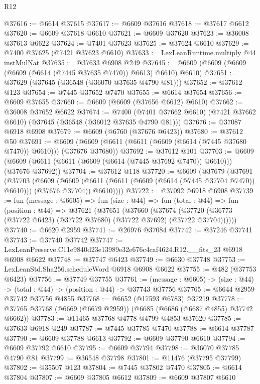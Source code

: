 \begin{lexlean}{R12}
\begin{coremodule}
@37616 := @6614 @37615
@37617 := @6609 @37616
@37618 := @37617 @6612
@37620 := @6609 @37618 @6610
@37621 := @6609 @37620
@37623 := @36008 @37613 @6622
@37624 := @7401 @37623
@37625 := @37624 @6610
@37629 := @7400 @37625 (@7421 @37623 @6610)
@37633 := LexLeanRuntime.multiply @44 instMulNat
@37635 := @37633 @6908 @249
@37645 := @6609 (@6609 (@6609 (@6609 (@6614 (@7445 @37635 @7470)) @6613) @6610) @6610)
@37651 := @37629 (@37645 (@36548 (@36070 @37635 @4790 @81)))
@37652 := @37612 @123
@37654 := @7445 @37652 @7470
@37655 := @6614 @37654
@37656 := @6609 @37655
@37660 := @6609 (@6609 (@37656 @6612) @6610)
@37662 := @36008 @37652 @6622
@37674 := @7400
    (@7401 @37662 @6610)
    (@7421 @37662 @6610)
    (@37645 (@36548 (@36012 @37635 @4790 @81)))
@37676 := @37087 @6918 @6908
@37679 := @6609 (@6760 (@37676 @6423))
@37680 := @37612 @50
@37691 := @6609 (@6609 (@6611 (@6611 (@6609 (@6614 (@7445 @37680 @7470)) @6610))) (@37676 @37680))
@37692 := @37612 @101
@37703 := @6609 (@6609 (@6611 (@6611 (@6609 (@6614 (@7445 @37692 @7470)) @6610))) (@37676 @37692))
@37704 := @37612 @118
@37720 := @6609
    (@37679
      (@37691
        (@37703
          (@6609
            (@6609 (@6611 (@6611 (@6609 (@6614 (@7445 @37704 @7470)) @6610))) (@37676 @37704))
            @6610))))
@37722 := @37092 @6918 @6908
@37739 := fun (message : @6605) =>
  fun (size : @44) =>
  fun (total : @44) =>
  fun (position : @44) =>
  @37621
    (@37651
      (@37660
        (@37674 (@37720 (@36773 (@37722 @6423) (@37722 @37680) (@37722 @37692) (@37722 @37704))))))
@37740 := @6620 @2959
@37741 := @26976 @37084
@37742 := @37246 @37741
@37743 := @37740 @37742
@37747 := LexLeanPreserve.C11e9840d23e13989e32e676c4caf4624.R12.__fits_23 @6918 @6908 @6622
@37748 := @37747 @6423
@37749 := @6630 @37748
@37753 := LexLeanStd.Sha256.scheduleWord @6918 @6908 @6622
@37755 := @482 (@37753 @6423)
@37756 := @37749 @37755
@37761 := (message : @6605) -> (size : @44) -> (total : @44) -> (position : @44) -> @37743 @37756
@37765 := @6644 @2959 @37742 @37756 @4855
@37768 := @6652 (@17593 @6783) @37219
@37778 := @37765 @37768 (@6669 (@6679 @2959)) (@6685 (@6686 (@6687 @4855) @37742 @6662))
@37783 := @11465 @37768 @4778 @4799 @4853 @37620
@37785 := @37633 @6918 @249
@37787 := @7445 @37785 @7470
@37788 := @6614 @37787
@37790 := @6609 @37788 @6613
@37792 := @6609 @37790 @6610
@37794 := @6609 @37792 @6610
@37795 := @6609 @37794
@37798 := @36070 @37785 @4790 @81
@37799 := @36548 @37798
@37801 := @11476 (@37795 @37799)
@37802 := @35507 @123
@37804 := @7445 @37802 @7470
@37805 := @6614 @37804
@37807 := @6609 @37805 @6612
@37809 := @6609 @37807 @6610

\end{coremodule}
\end{lexlean}
